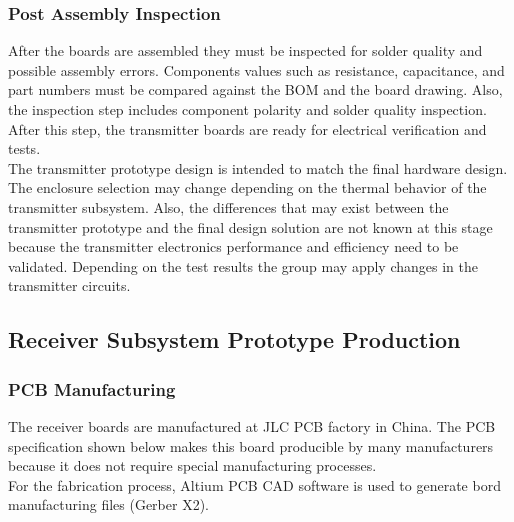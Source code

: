 \documentclass[12pt]{article}
\begin{document}
\subsubsection{Post Assembly Inspection}
After the boards are assembled they must be inspected for solder quality and possible assembly errors. Components values such as resistance, capacitance, and part numbers must be compared against the BOM and the board drawing. Also, the inspection step includes component polarity and solder quality inspection. After this step, the transmitter boards are ready for electrical verification and tests.\\

\indent
 The transmitter prototype design is intended to match the final hardware design. The enclosure selection may change depending on the thermal behavior of the transmitter subsystem. Also, the differences that may exist between the transmitter prototype and the final design solution are not known at this stage because the transmitter electronics performance and efficiency need to be validated. Depending on the test results the group may apply changes in the transmitter circuits.

\subsection{Receiver Subsystem Prototype Production}
\subsubsection{PCB Manufacturing} The receiver boards are manufactured at JLC PCB  factory in China. The PCB specification shown below makes this board producible by many manufacturers because it does not require special manufacturing processes.\\

\noindent
For the fabrication process, Altium PCB CAD software is used to generate bord manufacturing files (Gerber X2).\\
 
\end{document}
